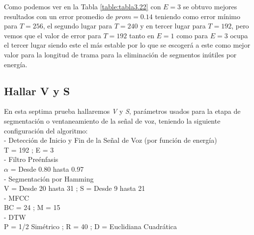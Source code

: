 Como podemos ver en la Tabla \ref{table:tabla3.22} con $E = 3$ se obtuvo mejores resultados con un error promedio de $prom = 0.14$ teniendo como error mínimo para $T = 256$, el segundo lugar para $T = 240$ y en tercer lugar para $T = 192$, pero vemos que el valor de error para $T = 192$ tanto en $E = 1$ como para $E = 3$ ocupa el tercer lugar siendo este el más estable por lo que se escogerá a este como mejor valor para la longitud de trama para la eliminación de segmentos inútiles por energía.

\subsection{Hallar V y S}
En esta septima prueba hallaremos \textit{V} y \textit{S}, parámetros usados para la etapa de segmentación o ventaneamiento de la señal de voz, teniendo la siguiente configuración del algoritmo:\\
- Detección de Inicio y Fin de la Señal de Voz (por función de energía) \\
\hspace*{1cm} T = 192 ; \qquad E = 3 \\
- Filtro Preénfasis \\
\hspace*{1cm} $\alpha$ = Desde 0.80 hasta 0.97 \\
- Segmentación por Hamming \\
\hspace*{1cm} V = Desde 20 hasta 31 ; \qquad S = Desde 9 hasta 21 \\
- MFCC \\
\hspace*{1cm} BC = 24 ; \qquad M = 15 \\
- DTW \\
\hspace*{1cm} P = 1/2 Simétrico ; \qquad R = 40 ; \qquad D = Euclidiana Cuadrática 

